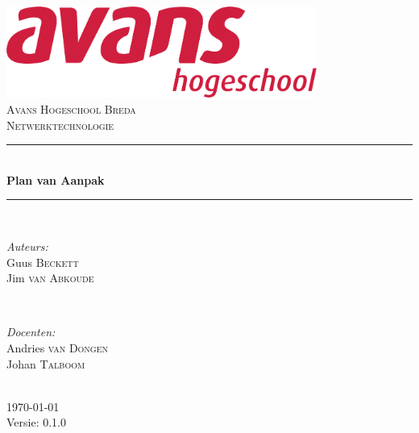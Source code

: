 \documentclass[12pt]{article}
\begin{document}
\begin{titlepage}
\newcommand{\HRule}{\rule{\linewidth}{0.5mm}} %

\center %

\includegraphics[height=3cm] {avans}\\%
\textsc{\Large Avans Hogeschool Breda}\\[0.5cm] %
\textsc{\large Netwerktechnologie}\\[0.5cm] %
\HRule \\[0.4cm]
{ \huge \bfseries Plan van Aanpak}\\[0.4cm] %
\HRule \\[1.5cm]

\begin{minipage}{0.4\textwidth}
\begin{flushleft} \large
\emph{Auteurs:}\\
Guus \textsc{Beckett} \\%
Jim \textsc{van Abkoude}
\end{flushleft}
\end{minipage}
~
\begin{minipage}{0.4\textwidth}
\begin{flushright} \large
\emph{Docenten:} \\
Andries \textsc{van Dongen} \\ %
Johan \textsc{Talboom}
\end{flushright}
\end{minipage}\\[4cm]

{\large \today}\\[3cm] %

Versie: 0.1.0

\vfill %

\end{titlepage}
\end{document}
